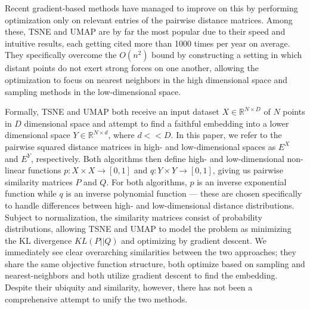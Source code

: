 \documentclass[sigconf, nonacm]{acmart}
\begin{document}
Recent gradient-based methods have managed to improve on this by performing optimization only on relevant entries of the pairwise distance matrices.
Among these, TSNE and UMAP are by far the most popular due to their speed and intuitive results, each getting cited more than 1000 times per year on average.
They specifically overcome the $O(n^2)$ bound by constructing a setting in which distant points do not exert strong forces on one another, allowing the optimization to focus on nearest neighbors in the high dimensional space and sampling methods in the low-dimensional space.

Formally, TSNE \cite{van2008visualizing} and UMAP \cite{mcinnes2018umap} both receive an input dataset $X \in \mathbb{R}^{N \times D}$ of
$N$ points in $D$ dimensional space and
attempt to find a faithful embedding into a lower dimensional space $Y \in \mathbb{R}^{N \times d}$, where $d << D$. 
 In this paper, we refer to the pairwise squared distance matrices in high- and low-dimensional spaces as $E^X$ and $E^Y$, respectively. Both algorithms then define high-
 and low-dimensional non-linear functions $p: X \times X \rightarrow [0, 1]$ and $q: Y \times Y \rightarrow [0, 1]$, giving us pairwise similarity matrices $P$
 and $Q$. For both algorithms, $p$ is an inverse exponential function while $q$ is an inverse polynomial function --- these are chosen specifically to handle
 differences between high- and low-dimensional distance distributions. Subject to normalization, the similarity matrices consist of probability distributions,
 allowing TSNE and UMAP to model the problem as minimizing the KL divergence $KL(P || Q)$ and optimizing by gradient descent.
We immediately see clear overarching similarities between the two approaches; they share the same objective function structure, both optimize based
on sampling and nearest-neighbors and both utilize gradient descent to find the embedding. Despite their ubiquity and similarity, however, there has not been
a comprehensive attempt to unify the two methods.
\end{document}
